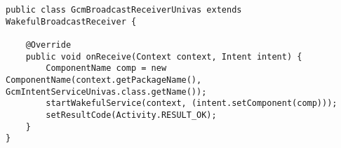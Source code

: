 \begin{lstlisting}[style=custom_JAVA]
public class GcmBroadcastReceiverUnivas extends WakefulBroadcastReceiver {

    @Override
    public void onReceive(Context context, Intent intent) {
        ComponentName comp = new ComponentName(context.getPackageName(),  GcmIntentServiceUnivas.class.getName());
        startWakefulService(context, (intent.setComponent(comp)));
        setResultCode(Activity.RESULT_OK);
    }
}
\end{lstlisting}